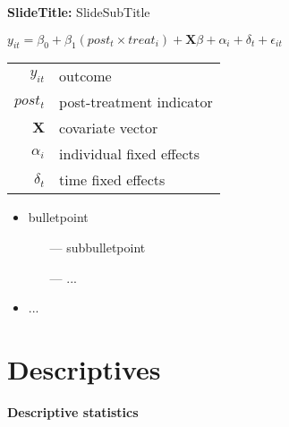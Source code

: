 \documentclass{beamer} %
\begin{document}
\begin{frame}{\textbf{SlideTitle:} SlideSubTitle}
    \begin{centering}
        {$y_{it} = \beta_{0} + \beta_{1} (post_{t}\times treat_{i}) + \pmb{X}\beta+ \alpha_{i} + \delta_{t} + \epsilon_{it}$}\\
    \end{centering}
    \vspace{.5cm}
    \begin{footnotesize}
        \hspace{2cm}\begin{tabular}{ r l }
            $y_{it}$ & outcome \\ 
            $post_{t}$ & post-treatment indicator\\
            $\pmb{X}$ & covariate vector\\
            $\alpha_{i}$ & individual fixed effects\\
            $\delta_{t}$ & time fixed effects
        \end{tabular}
    \end{footnotesize}
    \vspace{.5cm}
	\begin{itemize}
	    \item bulletpoint
    	\begin{itemize}
    	    \item[---] subbulletpoint
    	    \item[---] ...
    	\end{itemize}
    	\item ...
	\end{itemize}
\end{frame}

\section{Descriptives}
{
	\begin{frame}[plain]		
    	\vspace{1cm}
    	{\color{white}\LARGE \textbf{Descriptive statistics}}
    \end{frame}
    \addtocounter{framenumber}{-1}
}
\end{document}

